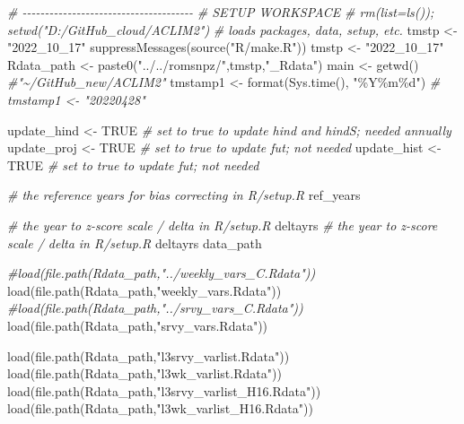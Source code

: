 \documentclass[
]{article}
\newenvironment{Shaded}{\begin{snugshade}}{\end{snugshade}}
\newcommand{\CommentTok}[1]{\textcolor[rgb]{0.56,0.35,0.01}{\textit{#1}}}
\newcommand{\ConstantTok}[1]{\textcolor[rgb]{0.00,0.00,0.00}{#1}}
\newcommand{\FunctionTok}[1]{\textcolor[rgb]{0.00,0.00,0.00}{#1}}
\newcommand{\NormalTok}[1]{#1}
\newcommand{\OtherTok}[1]{\textcolor[rgb]{0.56,0.35,0.01}{#1}}
\newcommand{\StringTok}[1]{\textcolor[rgb]{0.31,0.60,0.02}{#1}}
\begin{document}
\begin{Shaded}
\begin{Highlighting}[]
    \CommentTok{\# {-}{-}{-}{-}{-}{-}{-}{-}{-}{-}{-}{-}{-}{-}{-}{-}{-}{-}{-}{-}{-}{-}{-}{-}{-}{-}{-}{-}{-}{-}{-}{-}{-}{-}{-}{-}{-}{-}}
    \CommentTok{\# SETUP WORKSPACE}
    \CommentTok{\# rm(list=ls()); setwd("D:/GitHub\_cloud/ACLIM2")}
    \CommentTok{\# loads packages, data, setup, etc.}
\NormalTok{    tmstp       }\OtherTok{\textless{}{-}} \StringTok{"2022\_10\_17"}
    \FunctionTok{suppressMessages}\NormalTok{(}\FunctionTok{source}\NormalTok{(}\StringTok{"R/make.R"}\NormalTok{))}
\NormalTok{    tmstp       }\OtherTok{\textless{}{-}} \StringTok{"2022\_10\_17"}
\NormalTok{    Rdata\_path  }\OtherTok{\textless{}{-}} \FunctionTok{paste0}\NormalTok{(}\StringTok{"../../romsnpz/"}\NormalTok{,tmstp,}\StringTok{"\_Rdata"}\NormalTok{)}
\NormalTok{    main        }\OtherTok{\textless{}{-}} \FunctionTok{getwd}\NormalTok{()  }\CommentTok{\#"\textasciitilde{}/GitHub\_new/ACLIM2"}
\NormalTok{    tmstamp1    }\OtherTok{\textless{}{-}} \FunctionTok{format}\NormalTok{(}\FunctionTok{Sys.time}\NormalTok{(), }\StringTok{"\%Y\%m\%d"}\NormalTok{)}
    \CommentTok{\# tmstamp1  \textless{}{-} "20220428"}
    
    
\NormalTok{    update\_hind  }\OtherTok{\textless{}{-}} \ConstantTok{TRUE}   \CommentTok{\# set to true to update hind and hindS; needed annually}
\NormalTok{    update\_proj  }\OtherTok{\textless{}{-}} \ConstantTok{TRUE}   \CommentTok{\# set to true to update fut; not needed}
\NormalTok{    update\_hist  }\OtherTok{\textless{}{-}} \ConstantTok{TRUE}   \CommentTok{\# set to true to update fut; not needed}
     
    \CommentTok{\# the reference years for bias correcting in R/setup.R}
\NormalTok{    ref\_years }
    
    \CommentTok{\# the year to z{-}score scale / delta in R/setup.R}
\NormalTok{    deltayrs }
    \CommentTok{\# the year to z{-}score scale / delta in R/setup.R}
\NormalTok{    deltayrs }
\NormalTok{    data\_path}
    
    \CommentTok{\#load(file.path(Rdata\_path,"../weekly\_vars\_C.Rdata"))}
    \FunctionTok{load}\NormalTok{(}\FunctionTok{file.path}\NormalTok{(Rdata\_path,}\StringTok{"weekly\_vars.Rdata"}\NormalTok{))}
    \CommentTok{\#load(file.path(Rdata\_path,"../srvy\_vars\_C.Rdata"))}
    \FunctionTok{load}\NormalTok{(}\FunctionTok{file.path}\NormalTok{(Rdata\_path,}\StringTok{"srvy\_vars.Rdata"}\NormalTok{))}
    
    \FunctionTok{load}\NormalTok{(}\FunctionTok{file.path}\NormalTok{(Rdata\_path,}\StringTok{"l3srvy\_varlist.Rdata"}\NormalTok{))}
    \FunctionTok{load}\NormalTok{(}\FunctionTok{file.path}\NormalTok{(Rdata\_path,}\StringTok{"l3wk\_varlist.Rdata"}\NormalTok{))}
    \FunctionTok{load}\NormalTok{(}\FunctionTok{file.path}\NormalTok{(Rdata\_path,}\StringTok{"l3srvy\_varlist\_H16.Rdata"}\NormalTok{))}
    \FunctionTok{load}\NormalTok{(}\FunctionTok{file.path}\NormalTok{(Rdata\_path,}\StringTok{"l3wk\_varlist\_H16.Rdata"}\NormalTok{))}
    

\end{Highlighting}
\end{Shaded}
\end{document}
